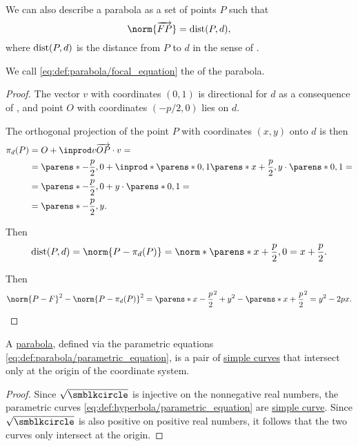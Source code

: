 \begin{definition}
\begin{thmenum}
     We can also describe a parabola as a set of points \( P \) such that
    \begin{equation}\label{eq:def:parabola/focal_equation}
      \norm{\vect{FP}} = \op{dist}(P, d),
    \end{equation}
    where \( \op{dist}(P, d) \) is the distance from \( P \) to \( d \) in the sense of .

    We call \eqref{eq:def:parabola/focal_equation} the  of the parabola.
  \end{thmenum}
\end{definition}
\begin{proof}
   The vector \( v \) with coordinates \( (0, 1) \) is directional for \( d \) as a consequence of , and point \( O \) with coordinates \( (-p / 2, 0) \) lies on \( d \).

  The orthogonal projection of the point \( P \) with coordinates \( (x, y) \) onto \( d \) is then
  \begin{align*}
    \pi_d(P)
    &=
    O + \inprod v {\vect{OP}} \cdot v
    = \\ &=
    \parens*{ -\frac p 2, 0 } + \inprod*{ \parens*{ 0, 1 } } { \parens*{ x + \frac p 2, y } } \cdot \parens*{ 0, 1 }
    = \\ &=
    \parens*{ -\frac p 2, 0 } + y \cdot \parens*{ 0, 1 }
    = \\ &=
    \parens*{ -\frac p 2, y }.
  \end{align*}

  Then
  \begin{equation*}
    \op{dist}(P, d)
    =
    \norm{P - \pi_d(P)}
    =
    \norm*{\parens*{ x + \frac p 2, 0 }}
    =
    x + \frac p 2.
  \end{equation*}

  Then
  \begin{equation*}
    \norm{P - F}^2 - \norm{P - \pi_d(P)}^2
    =
    \parens*{ x - \frac p 2 }^2 + y^2 - \parens*{ x + \frac p 2 }^2
    =
    y^2 - 2px.
  \end{equation*}
\end{proof}

\begin{proposition}\label{thm:parabola_is_closed_simple_curve}
  A \hyperref[def:parabola]{parabola}, defined via the parametric equations \eqref{eq:def:parabola/parametric_equation}, is a pair of \hyperref[def:simple_curve]{simple curves} that intersect only at the origin of the coordinate system.
\end{proposition}
\begin{proof}
  Since \( \sqrt {\anon} \) is injective on the nonnegative real numbers, the parametric curves \eqref{eq:def:hyperbola/parametric_equation} are \hyperref[def:simple_curve]{simple curve}. Since \( \sqrt {\anon} \) is also positive on positive real numbers, it follows that the two curves only intersect at the origin.
\end{proof}

